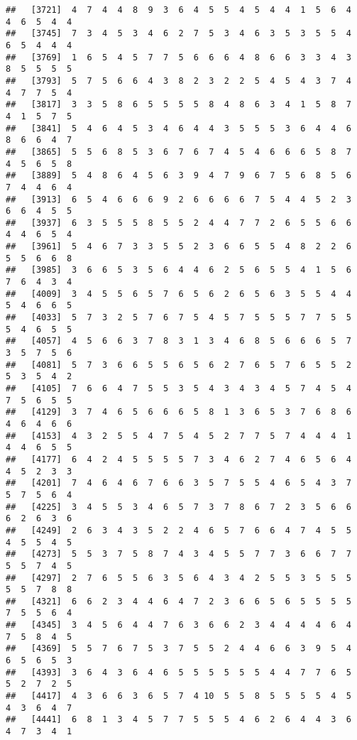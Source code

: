 \documentclass[
]{book}
\begin{document}
\begin{verbatim}
##   [3721]  4  7  4  4  8  9  3  6  4  5  5  4  5  4  4  1  5  6  4  4  6  5  4  4
##   [3745]  7  3  4  5  3  4  6  2  7  5  3  4  6  3  5  3  5  5  4  6  5  4  4  4
##   [3769]  1  6  5  4  5  7  7  5  6  6  6  4  8  6  6  3  3  4  3  8  5  5  5  5
##   [3793]  5  7  5  6  6  4  3  8  2  3  2  2  5  4  5  4  3  7  4  4  7  7  5  4
##   [3817]  3  3  5  8  6  5  5  5  5  8  4  8  6  3  4  1  5  8  7  4  1  5  7  5
##   [3841]  5  4  6  4  5  3  4  6  4  4  3  5  5  5  3  6  4  4  6  8  6  6  4  7
##   [3865]  5  5  6  8  5  3  6  7  6  7  4  5  4  6  6  6  5  8  7  4  5  6  5  8
##   [3889]  5  4  8  6  4  5  6  3  9  4  7  9  6  7  5  6  8  5  6  7  4  4  6  4
##   [3913]  6  5  4  6  6  6  9  2  6  6  6  6  7  5  4  4  5  2  3  6  6  4  5  5
##   [3937]  6  3  5  5  5  8  5  5  2  4  4  7  7  2  6  5  5  6  6  4  4  6  5  4
##   [3961]  5  4  6  7  3  3  5  5  2  3  6  6  5  5  4  8  2  2  6  5  5  6  6  8
##   [3985]  3  6  6  5  3  5  6  4  4  6  2  5  6  5  5  4  1  5  6  7  6  4  3  4
##   [4009]  3  4  5  5  6  5  7  6  5  6  2  6  5  6  3  5  5  4  4  5  4  6  6  5
##   [4033]  5  7  3  2  5  7  6  7  5  4  5  7  5  5  5  7  7  5  5  5  4  6  5  5
##   [4057]  4  5  6  6  3  7  8  3  1  3  4  6  8  5  6  6  6  5  7  3  5  7  5  6
##   [4081]  5  7  3  6  6  5  5  6  5  6  2  7  6  5  7  6  5  5  2  5  3  5  4  2
##   [4105]  7  6  6  4  7  5  5  3  5  4  3  4  3  4  5  7  4  5  4  7  5  6  5  5
##   [4129]  3  7  4  6  5  6  6  6  5  8  1  3  6  5  3  7  6  8  6  4  6  4  6  6
##   [4153]  4  3  2  5  5  4  7  5  4  5  2  7  7  5  7  4  4  4  1  4  4  6  5  5
##   [4177]  6  4  2  4  5  5  5  5  7  3  4  6  2  7  4  6  5  6  4  4  5  2  3  3
##   [4201]  7  4  6  4  6  7  6  6  3  5  7  5  5  4  6  5  4  3  7  5  7  5  6  4
##   [4225]  3  4  5  5  3  4  6  5  7  3  7  8  6  7  2  3  5  6  6  6  2  6  3  6
##   [4249]  2  6  3  4  3  5  2  2  4  6  5  7  6  6  4  7  4  5  5  4  5  5  4  5
##   [4273]  5  5  3  7  5  8  7  4  3  4  5  5  7  7  3  6  6  7  7  5  5  7  4  5
##   [4297]  2  7  6  5  5  6  3  5  6  4  3  4  2  5  5  3  5  5  5  5  5  7  8  8
##   [4321]  6  6  2  3  4  4  6  4  7  2  3  6  6  5  6  5  5  5  5  7  5  5  6  4
##   [4345]  3  4  5  6  4  4  7  6  3  6  6  2  3  4  4  4  4  6  4  7  5  8  4  5
##   [4369]  5  5  7  6  7  5  3  7  5  5  2  4  4  6  6  3  9  5  4  6  5  6  5  3
##   [4393]  3  6  4  3  6  4  6  5  5  5  5  5  5  4  4  7  7  6  5  5  2  7  2  5
##   [4417]  4  3  6  6  3  6  5  7  4 10  5  5  8  5  5  5  5  4  5  4  3  6  4  7
##   [4441]  6  8  1  3  4  5  7  7  5  5  5  4  6  2  6  4  4  3  6  4  7  3  4  1

\end{verbatim}
\end{document}
